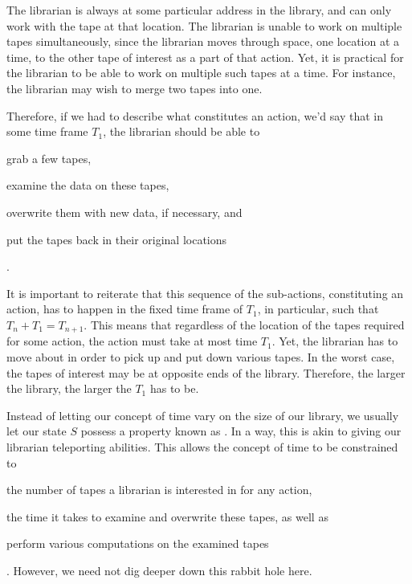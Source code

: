 The librarian is always at some particular address in the library, and can only
work with the tape at that location. The librarian is unable to work on
multiple tapes simultaneously, since the librarian moves through space, one
location at a time, to the other tape of interest as a part of that action.
Yet, it is practical for the librarian to be able to work on multiple such
tapes at a time. For instance, the librarian may wish to merge two tapes into
one.



Therefore, if we had to describe what constitutes an action, we'd say that in
some time frame $T_1$, the librarian should be able to \begin{inparaenum}[(1)]
\item grab a few tapes, \item examine the data on these tapes, \item overwrite
them with new data, if necessary, and \item put the tapes back in their
original locations\end{inparaenum}.

It is important to reiterate that this sequence of the sub-actions,
constituting an action, has to happen in the fixed time frame of $T_1$, in
particular, such that $T_n+T_1=T_{n+1}$.  This means that regardless of the
location of the tapes required for some action, the action must take at most
time $T_1$. Yet, the librarian has to move about in order to pick up and put
down various tapes. In the worst case, the tapes of interest may be at opposite
ends of the library. Therefore, the larger the library, the larger the $T_1$
has to be. 

Instead of letting our concept of time vary on the size of our library, we
usually let our state $S$ possess a property known as . In a
way, this is akin to giving our librarian teleporting abilities. This allows
the concept of time to be constrained to \begin{inparaenum}[(1)] \item the
number of tapes a librarian is interested in for any action, \item the time it
takes to examine and overwrite these tapes, as well as \item perform various
computations on the examined tapes\end{inparaenum}. However, we need not dig
deeper down this rabbit hole here.


